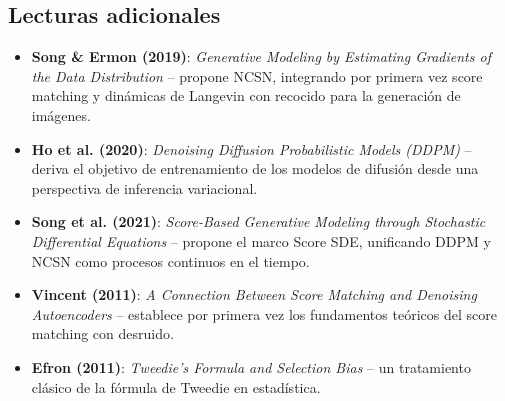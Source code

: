 \subsection{Lecturas adicionales}

\begin{itemize}
    \item \textbf{Song \& Ermon (2019)}: \textit{Generative Modeling by Estimating Gradients of the Data Distribution} -- propone NCSN, integrando por primera vez score matching y dinámicas de Langevin con recocido para la generación de imágenes.
    \item \textbf{Ho et al. (2020)}: \textit{Denoising Diffusion Probabilistic Models (DDPM)} -- deriva el objetivo de entrenamiento de los modelos de difusión desde una perspectiva de inferencia variacional.
    \item \textbf{Song et al. (2021)}: \textit{Score-Based Generative Modeling through Stochastic Differential Equations} -- propone el marco Score SDE, unificando DDPM y NCSN como procesos continuos en el tiempo.
    \item \textbf{Vincent (2011)}: \textit{A Connection Between Score Matching and Denoising Autoencoders} -- establece por primera vez los fundamentos teóricos del score matching con desruido.
    \item \textbf{Efron (2011)}: \textit{Tweedie's Formula and Selection Bias} -- un tratamiento clásico de la fórmula de Tweedie en estadística.
\end{itemize}



